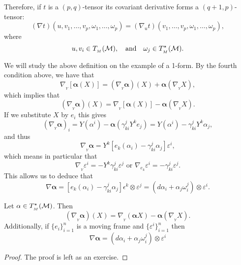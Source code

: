 Therefore, if $t$ is a $(p,q)$-tensor its covariant derivative forms a $(q+1,p)$-tensor:
\[(\nabla t)(u,v_{1},\dots,v_{p},\omega_{1},\dots,\omega_{p})=(\nabla_{u} t)(v_{1},\dots,v_{p},\omega_{1},\dots,\omega_{p}),\] where \[ u,v_{i}\in T_{_{M}}(\mathcal{M}),\quad \text{and}\quad \omega_{j}\in T^{\star}_{_{M}}(\mathcal{M}).
\]

\vspace{3pt}

\vspace{3pt}
We will study the above definition on the example of a 1-form. By the fourth condition above, we have that 
\[
\nabla_{_{Y}}[\mathbf{\alpha}(X)] = (\nabla_{_{Y}}\mathbf{\alpha})(X)+\mathbf{\alpha}(\nabla_{_{Y}}X),\]
which implies that 
\[(\nabla_{_{Y}} \mathbf{\alpha})(X) =\nabla_{_{Y}}[\mathbf{\alpha}(X)]- \mathbf{\alpha}(\nabla_{_{Y}}X).
\]
If we substitute $X$ by $e_{i}$ this gives
\[
(\nabla_{_{Y}} \mathbf{\alpha})_{i}=Y(\alpha^{i}) - \mathbf{\alpha}(\gamma^{j}_{ki}Y^{k}e_{j})=Y(\alpha^{i})-\gamma^{j}_{ki}Y^{k}\alpha_{j},
\]
and thus
\[
\nabla_{_{Y}} \mathbf{\alpha}=Y^{k}[e_{k}(\alpha_{i})-\gamma^{j}_{ki}\alpha_{j}]\varepsilon^{i},
\]
which means in particular that 
\begin{equation}
\nabla_{_{Y}} \varepsilon^{ i} = -Y^{k}\gamma^{j}_{ki}\varepsilon^{j} \text{ or } \nabla_{e_{k}} \varepsilon^{ i} = -\gamma^{j}_{ki}\varepsilon^{j}.
\end{equation}
This allows us to deduce that
\[
\nabla \mathbf{\alpha}= [e_{k}(\alpha_{i}) -\gamma^{j}_{ki}\alpha_{j}]\epsilon^{k}\otimes \varepsilon^{j}=(d\alpha_{i}+ \alpha_{j}\omega^{j}_{i})\otimes \varepsilon^{i}.
\]
\begin{proposition}
Let $\mathbf{\alpha}\in T^{\star}_{_{M}}(\mathcal{M})$. Then
 \begin{equation}
(\nabla_{_{Y}} \mathbf{\alpha})(X) =\nabla_{_{Y}}(\mathbf{\alpha}X)- \mathbf{\alpha}(\nabla_{_{Y}}X).
\end{equation}
Additionally, if $\{e_{i}\}_{i=1}^{n}$ is a moving frame and $\{\varepsilon^{i}\}_{i=1}^{n}$ then 
\begin{equation}
\nabla \mathbf{\alpha} =(d\alpha_{i}+ \alpha_{j}\omega^{j}_{i})\otimes \varepsilon^{i}
\end{equation}
\end{proposition}

\begin{proof}
    The proof is left as an exercise. 
\end{proof}


